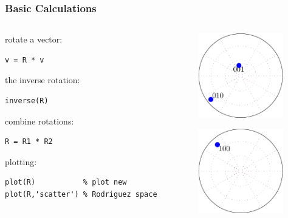 \begin{frame}[fragile]
  \frametitle{Basic Calculations}

  \begin{columns}
    \begin{column}{8cm}

  rotate a vector:
\begin{lstlisting}
v = R * v
\end{lstlisting}

  \pause \medskip

the inverse rotation:
\begin{lstlisting}
inverse(R)
\end{lstlisting}

  \pause \medskip

  combine rotations:
\begin{lstlisting}
R = R1 * R2
\end{lstlisting}

  \pause \medskip

  plotting:
\begin{lstlisting}
plot(R)           % plot new
plot(R,'scatter') % Rodriguez space
\end{lstlisting}

    \end{column}

    \begin{column}{3.7cm}
      \includegraphics[width=3.7cm]{pic/rotationNorth}

      \includegraphics[width=3.7cm]{pic/rotationSouth}
    \end{column}

  \end{columns}

\end{frame}


